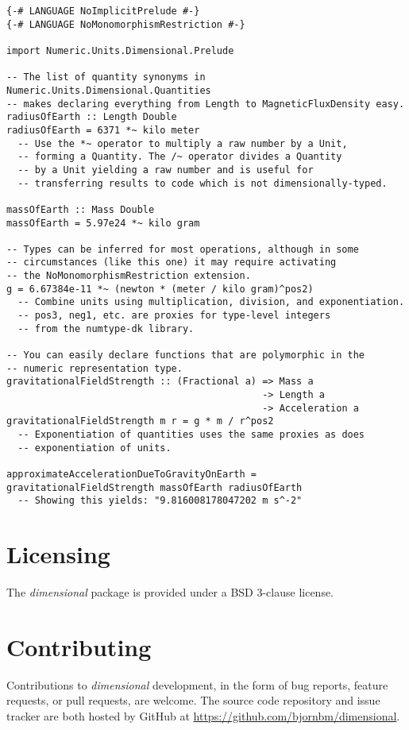 \documentclass[11pt]{report}
\newcommand{\packagename}[1]{\textit{#1}}
\newcommand{\thispackage}{\packagename{dimensional}}
\begin{document}
\begin{lstlisting}
{-# LANGUAGE NoImplicitPrelude #-}
{-# LANGUAGE NoMonomorphismRestriction #-}

import Numeric.Units.Dimensional.Prelude

-- The list of quantity synonyms in Numeric.Units.Dimensional.Quantities
-- makes declaring everything from Length to MagneticFluxDensity easy.
radiusOfEarth :: Length Double
radiusOfEarth = 6371 *~ kilo meter
  -- Use the *~ operator to multiply a raw number by a Unit, 
  -- forming a Quantity. The /~ operator divides a Quantity
  -- by a Unit yielding a raw number and is useful for
  -- transferring results to code which is not dimensionally-typed.

massOfEarth :: Mass Double
massOfEarth = 5.97e24 *~ kilo gram

-- Types can be inferred for most operations, although in some
-- circumstances (like this one) it may require activating
-- the NoMonomorphismRestriction extension.
g = 6.67384e-11 *~ (newton * (meter / kilo gram)^pos2)
  -- Combine units using multiplication, division, and exponentiation.
  -- pos3, neg1, etc. are proxies for type-level integers
  -- from the numtype-dk library.

-- You can easily declare functions that are polymorphic in the
-- numeric representation type.
gravitationalFieldStrength :: (Fractional a) => Mass a 
                                             -> Length a
                                             -> Acceleration a
gravitationalFieldStrength m r = g * m / r^pos2
  -- Exponentiation of quantities uses the same proxies as does
  -- exponentiation of units.

approximateAccelerationDueToGravityOnEarth = gravitationalFieldStrength massOfEarth radiusOfEarth
  -- Showing this yields: "9.816008178047202 m s^-2"
\end{lstlisting}

\section{Licensing}

The \thispackage{} package is provided under a BSD 3-clause license.

\section{Contributing}

Contributions to \thispackage{} development, in the form of bug reports,
feature requests, or pull requests, are welcome. The source code repository and issue
tracker are both hosted by GitHub at \url{https://github.com/bjornbm/dimensional}.
\end{document}
